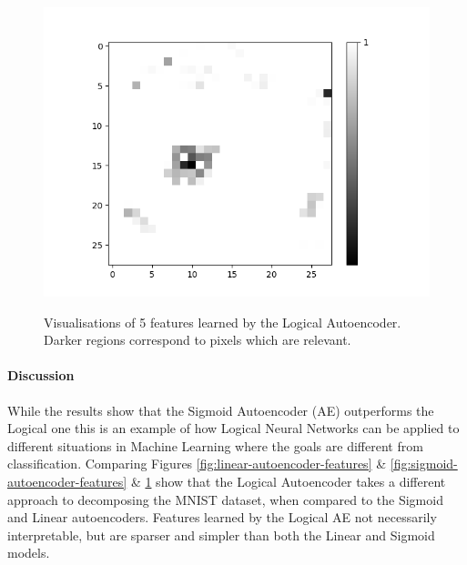 \begin{figure}[H]
\begin{minipage}[b]{0.19\textwidth}
		\includegraphics[width=\textwidth]{LoAE(AND)(20LF)/False/Feature-17.png}
		\label{}
	\end{minipage}
	\caption{Visualisations of 5 features learned by the Logical Autoencoder. Darker regions correspond to pixels which are relevant.}
	\label{fig:logical-autoencoder-features}
	\hfill
\end{figure}

\paragraph{Discussion}
While the results show that the Sigmoid Autoencoder (AE) outperforms the Logical one this is an example of how Logical Neural Networks can be applied to different situations in Machine Learning where the goals are different from classification. Comparing Figures \ref{fig:linear-autoencoder-features} \& \ref{fig:sigmoid-autoencoder-features} \& \ref{fig:logical-autoencoder-features} show that the Logical Autoencoder takes a different approach to decomposing the MNIST dataset, when compared to the Sigmoid and Linear autoencoders. Features learned by the Logical AE not necessarily interpretable, but are sparser and simpler than both the Linear and Sigmoid models.

